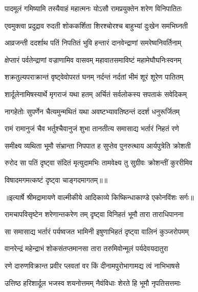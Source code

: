 \twolineshloka
{पादमूलं गमिष्यामि तस्यैवाहं महात्मनः}
{योऽसौ रामप्रयुक्तेन शरेण विनिपातितः} %

\twolineshloka
{एवमुक्त्वा प्रदुद्राव रुदती शोककर्शिता}
{शिरश्चोरश्च बाहुभ्यां दुःखेन समभिघ्नती} %

\twolineshloka
{आव्रजन्ती ददर्शाथ पतिं निपतितं भुवि}
{हन्तारं दानवेन्द्राणां समरेष्वनिवर्तिनाम्} %

\twolineshloka
{क्षेप्तारं पर्वतेन्द्राणां वज्राणामिव वासवम्}
{महावातसमाविष्टं महामेघौघनिःस्वनम्} %

\twolineshloka
{शक्रतुल्यपराक्रान्तं वृष्ट्वेवोपरतं घनम्}
{नर्दन्तं नर्दतां भीमं शूरं शूरेण पातितम्} %

\twolineshloka
{शार्दूलेनामिषस्यार्थे मृगराजं यथा हतम्}
{अर्चितं सर्वलोकस्य सपताकं सवेदिकम्} %

\twolineshloka
{नागहेतोः सुपर्णेन चैत्यमुन्मथितं यथा}
{अवष्टभ्यावतिष्ठन्तं ददर्श धनुरूर्जितम्} %

\twolineshloka
{रामं रामानुजं चैव भर्तुश्चैवानुजं शुभा}
{तानतीत्य समासाद्य भर्तारं निहतं रणे} %

\twolineshloka
{समीक्ष्य व्यथिता भूमौ संभ्रान्ता निपपात ह}
{सुप्तेव पुनरुत्थाय आर्यपुत्रेति क्रोशती} %

\twolineshloka
{रुरोद सा पतिं दृष्ट्वा संदितं मृत्युदामभिः}
{तामवेक्ष्य तु सुग्रीवः क्रोशन्तीं कुररीमिव} %

{विषादमगमत्कष्टं दृष्ट्वा चाङ्गदमागतम्॥॥} %

\addtocounter{shlokacount}{1}


{॥इत्यार्षे श्रीमद्रामायणे वाल्मीकीये आदिकाव्ये किष्किन्धाकाण्डे एकोनविंशः सर्गः॥}


\twolineshloka
{रामचापविसृष्टेन शरेणान्तकरेण तम्}
{दृष्ट्वा विनिहतं भूमौ तारा ताराधिपानना} %

\twolineshloka
{सा समासाद्य भर्तारं पर्यष्वजत भामिनी}
{इषुणाभिहतं दृष्ट्वा वालिनं कुञ्जरोपमम्} %

\twolineshloka
{वानरेन्द्रं महेन्द्राभं शोकसंतप्तमानसा}
{तारा तरुमिवोन्मूलं पर्यदेवयदातुरा} %

\twolineshloka
{रणे दारुणविक्रान्त प्रवीर प्लवतां वर}
{किं दीनामपुरोभागामद्य त्वं नाभिभाषसे} %

\twolineshloka
{उत्तिष्ठ हरिशार्दूल भजस्व शयनोत्तमम्}
{नैवंविधाः शेरते हि भूमौ नृपतिसत्तमाः} %

